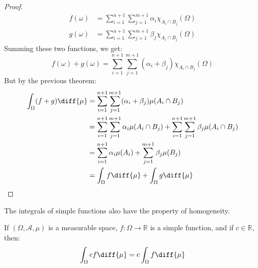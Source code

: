\begin{proof}
\begin{align}
                    f(\omega)&=
                    \sum_{i=1}^{n+1}\sum_{j=1}^{m+1}\alpha_{i}
                        \chi_{A_{i}\cap{B}_{j}}(\Omega)\\
                    g(\omega)&=
                    \sum_{i=1}^{n+1}\sum_{j=1}^{m+1}\beta_{j}
                        \chi_{A_{i}\cap{B}_{j}}(\Omega)
                \end{align}
                Summing these two functions, we get:
                \begin{equation}
                    f(\omega)+g(\omega)=
                    \sum_{i=1}^{n+1}\sum_{j=1}^{m+1}
                        (\alpha_{i}+\beta_{j})
                        \chi_{A_{i}\cap{B}_{j}}(\Omega)
                \end{equation}
                But by the previous theorem:
                \begin{align}
                    \int_{\Omega}(f+g)\diff{\mu}
                    &=\sum_{i=1}^{n+1}\sum_{j=1}^{m+1}
                        (\alpha_{i}+\beta_{j})
                        \mu(A_{i}\cap{B}_{j})\\
                    &=\sum_{i=1}^{n+1}\sum_{j=1}^{m+1}
                        \alpha_{i}\mu(A_{i}\cap{B}_{j})+
                        \sum_{i=1}^{n+1}\sum_{j=1}^{m+1}
                        \beta_{j}\mu(A_{i}\cap{B}_{j})\\
                    &=\sum_{i=1}^{n+1}\alpha_{i}\mu(A_{i})+
                        \sum_{j=1}^{m+1}\beta_{j}\mu(B_{j})\\
                    &=\int_{\Omega}f\diff{\mu}+
                        \int_{\Omega}g\diff{\mu}
                \end{align}
            \end{proof}
            The integrals of simple functions also have the
            property of homogeneity.
            \begin{theorem}
                If $(\Omega,\mathcal{A},\mu)$ is a measurable
                space, $f:\Omega\rightarrow\mathbb{R}$ is
                a simple function, and if $c\in\mathbb{R}$,
                then:
                \begin{equation}
                    \int_{\Omega}cf\diff{\mu}=
                    c\int_{\Omega}f\diff{\mu}
                \end{equation}
            \end{theorem}
